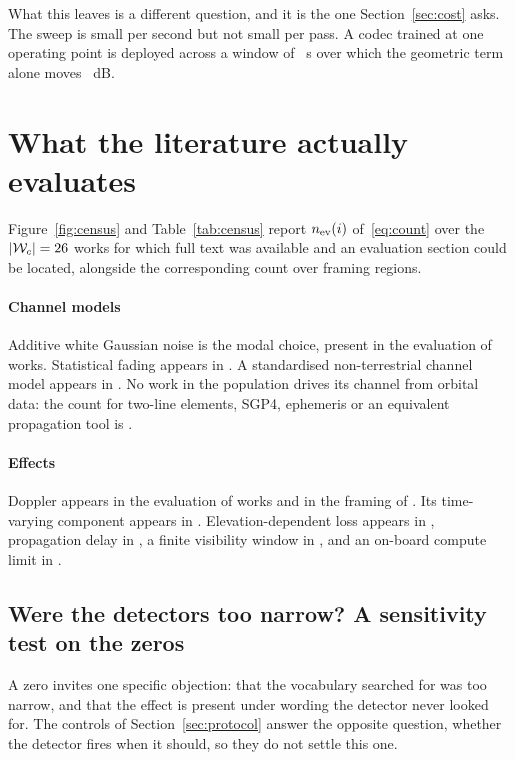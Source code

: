 \documentclass[preprint,11pt,3p]{elsarticle}
\begin{document}
What this leaves is a different question, and it is the one Section~\ref{sec:cost} asks. The
sweep is small per second but not small per pass. A codec trained at one operating point is
deployed across a window of \numDurMed~s over which the geometric term alone moves
\numFsplMed~dB.

\section{What the literature actually evaluates}
\label{sec:census}

Figure~\ref{fig:census} and Table~\ref{tab:census} report $n_{\rm ev}(i)$ of~\eqref{eq:count}
over the $|\mathcal{W}_c| = 26{}$ works for which full text was available and an
evaluation section could be located, alongside the corresponding count over framing regions.

\paragraph{Channel models}
Additive white Gaussian noise is the modal choice, present in the evaluation of
\numEvCHAWGN{} works. Statistical fading appears in \numEvCHFADING{}. A standardised
non-terrestrial channel model appears in \numEvCHGPP{}. No work in the population drives its
channel from orbital data: the count for two-line elements, SGP4, ephemeris or an equivalent
propagation tool is \numEvCHTRACE{}.

\paragraph{Effects}
Doppler appears in the evaluation of \numEvDOPPLER{} works and in the framing of
\numInDOPPLER{}. Its time-varying component appears in \numEvDOPPLERRATE{}. Elevation-dependent
loss appears in \numEvPATHLOSSELEV{}, propagation delay in \numEvDELAY{}, a finite visibility
window in \numEvVISIBILITY{}, and an on-board compute limit in \numEvONBOARD{}.

\subsection{Were the detectors too narrow? A sensitivity test on the zeros}
\label{sec:zerosens}

A zero invites one specific objection: that the vocabulary searched for was too narrow, and that
the effect is present under wording the detector never looked for. The controls of
Section~\ref{sec:protocol} answer the opposite question, whether the detector fires when it
should, so they do not settle this one.
\end{document}
